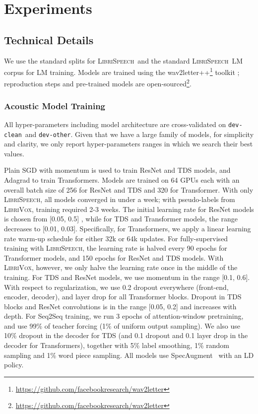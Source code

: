 \documentclass{article}
\def\devclean{\texttt{dev-clean}}
\def\devother{\texttt{dev-other}}
\newcommand{\librivox}{\textsc{LibriVox}}
\newcommand{\librispeech}{\textsc{LibriSpeech}}
\begin{document}
\section{Experiments}
\label{sec:experiments}
\subsection{Technical Details}
\label{sec:experimentstechnicaldetails}

We use the standard splits for \librispeech~and the standard \librispeech~LM corpus for LM training. Models are trained using the wav2letter++\footnote{\url{https://github.com/facebookresearch/wav2letter}} toolkit \cite{pratap2018wav2letter}; reproduction steps and pre-trained models are open-sourced\footnote{\url{https://github.com/facebookresearch/wav2letter}}.

\subsubsection{Acoustic Model Training}
\label{sec:amtraining}
All hyper-parameters including model architecture are cross-validated on \devclean~and \devother. Given that we have a large family of models, for simplicity and clarity, we only report hyper-parameters ranges in which we search their best values.

Plain SGD with momentum is used to train ResNet and TDS models, and Adagrad \cite{duchi2011adaptive} to train Transformers. 
Models are trained on 64 GPUs each with an overall batch size of 256 for ResNet and TDS and 320 for Transformer. 
With only \librispeech, all models converged in under a week; with pseudo-labels from \librivox, training required 2-3 weeks.
The initial learning rate for ResNet models is chosen from [0.05, 0.5]
, while for TDS and Transformer models, the range decreases to [0.01, 0.03]. Specifically, for Transformers, we apply a linear learning rate warm-up schedule for either 32k or 64k updates. For fully-supervised training with \librispeech, the learning rate is halved every 90 epochs for Transformer models, and 150 epochs for ResNet and TDS models. With \librivox, however, we only halve the learning rate once in the middle of the training. For TDS and ResNet models, we use momentum in the range [0.1, 0.6]. With respect to regularization, we use 0.2 dropout everywhere (front-end, encoder, decoder), and layer drop for all Transformer blocks. Dropout in TDS blocks and ResNet convolutions is in the range [0.05, 0.2] and increases with depth. For Seq2Seq training, we run 3 epochs of attention-window pretraining, and use 99\%  of  teacher  forcing (1\%  of uniform output sampling). We also use 10\% dropout in the decoder for TDS (and 0.1 dropout and 0.1 layer drop in the decoder for Transformers), together with 5\% label smoothing, 1\% random sampling and 1\% word piece sampling. 
All models use SpecAugment~\cite{park2019specaug} with an LD policy.
\end{document}

